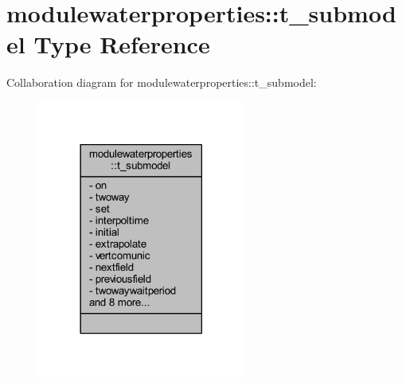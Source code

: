 \hypertarget{structmodulewaterproperties_1_1t__submodel}{}\section{modulewaterproperties\+:\+:t\+\_\+submodel Type Reference}
\label{structmodulewaterproperties_1_1t__submodel}


Collaboration diagram for modulewaterproperties\+:\+:t\+\_\+submodel\+:\nopagebreak
\begin{figure}[H]
\begin{center}
\leavevmode
\includegraphics[width=194pt]{structmodulewaterproperties_1_1t__submodel__coll__graph}
\end{center}
\end{figure}
